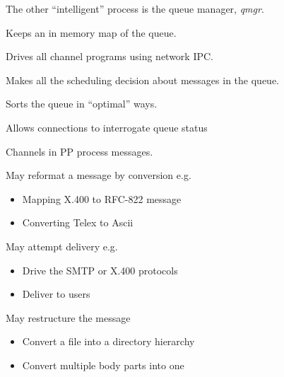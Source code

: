 \begin{bwslide}
\begin{nrtc}
\item	The other ``intelligent'' process is the queue manager, {\em qmgr}.

\item	Keeps an in memory map of the queue.

\item	Drives all channel programs using network IPC.

\item	Makes all the scheduling decision about messages in the queue.

\item	Sorts the queue  in ``optimal'' ways.

\item	Allows connections to interrogate queue status
\end{nrtc}
\end{bwslide}


\begin{bwslide}
\begin{nrtc}
\item	Channels in PP process messages.

\item	May reformat a message by conversion e.g.
	\begin{itemize}
	\item	Mapping X.400 to RFC-822 message
	\item	Converting Telex to Ascii
	\end{itemize}
\item	May attempt delivery e.g.
	\begin{itemize}
	\item	Drive the SMTP or X.400 protocols
	\item	Deliver to users
	\end{itemize}
\item	May restructure the message
	\begin{itemize}
	\item	Convert a file into a directory hierarchy
	\item	Convert multiple body parts into one
	\end{itemize}
\end{nrtc}
\end{bwslide}

